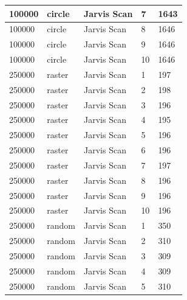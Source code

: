 \documentclass[12pt]{article}
\begin{document}
\begin{longtable}{|l|l|l|l|l|}
100000       & circle            & Jarvis Scan & 7          & 1643                          \\ \hline
100000       & circle            & Jarvis Scan & 8          & 1646                          \\ \hline
100000       & circle            & Jarvis Scan & 9          & 1646                          \\ \hline
100000       & circle            & Jarvis Scan & 10         & 1646                          \\ \hline
250000       & raster            & Jarvis Scan & 1          & 197                           \\ \hline
250000       & raster            & Jarvis Scan & 2          & 198                           \\ \hline
250000       & raster            & Jarvis Scan & 3          & 196                           \\ \hline
250000       & raster            & Jarvis Scan & 4          & 195                           \\ \hline
250000       & raster            & Jarvis Scan & 5          & 196                           \\ \hline
250000       & raster            & Jarvis Scan & 6          & 196                           \\ \hline
250000       & raster            & Jarvis Scan & 7          & 197                           \\ \hline
250000       & raster            & Jarvis Scan & 8          & 196                           \\ \hline
250000       & raster            & Jarvis Scan & 9          & 196                           \\ \hline
250000       & raster            & Jarvis Scan & 10         & 196                           \\ \hline
250000       & random            & Jarvis Scan & 1          & 350                           \\ \hline
250000       & random            & Jarvis Scan & 2          & 310                           \\ \hline
250000       & random            & Jarvis Scan & 3          & 309                           \\ \hline
250000       & random            & Jarvis Scan & 4          & 309                           \\ \hline
250000       & random            & Jarvis Scan & 5          & 310                           \\ \hline

\end{longtable}
\end{document}
